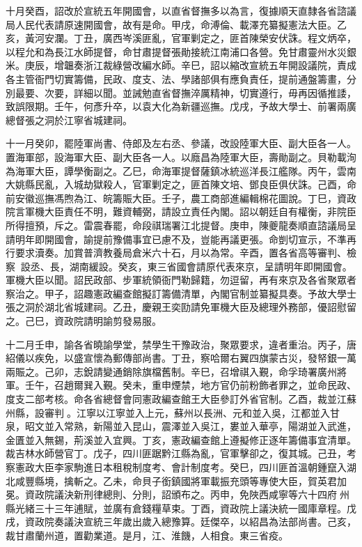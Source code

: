 \begin{pinyinscope}
十月癸酉，詔改於宣統五年開國會，以直省督撫多以為言，復據順天直隸各省諮議局人民代表請原速開國會，故有是命。甲戌，命溥倫、載澤充纂擬憲法大臣。乙亥，黃河安瀾。丁丑，廣西岑溪匪亂，官軍剿定之，匪首陳榮安伏誅。程文炳卒，以程允和為長江水師提督，命甘肅提督張勛接統江南浦口各營。免甘肅靈州水災銀米。庚辰，增韞奏浙江裁綠營改編水師。辛巳，詔以縮改宣統五年開設議院，責成各主管衙門切實籌備，民政、度支、法、學諸部俱有應負責任，提前通盤籌畫，分別最要、次要，詳細以聞。並誡勉直省督撫淬厲精神，切實遵行，毋再因循推諉，致誤限期。壬午，何彥升卒，以袁大化為新疆巡撫。戊戌，予故大學士、前署兩廣總督張之洞於江寧省城建祠。

十一月癸卯，罷陸軍尚書、侍郎及左右丞、參議，改設陸軍大臣、副大臣各一人。置海軍部，設海軍大臣、副大臣各一人。以廕昌為陸軍大臣，壽勛副之。貝勒載洵為海軍大臣，譚學衡副之。乙巳，命海軍提督薩鎮冰統巡洋長江艦隊。丙午，雲南大姚縣民亂，入城劫獄殺人，官軍剿定之，匪首陳文培、鄧良臣俱伏誅。己酉，命前安徽巡撫馮煦為江、皖籌賑大臣。壬子，農工商部進編輯棉花圖說。丁巳，資政院言軍機大臣責任不明，難資輔弼，請設立責任內閣。詔以朝廷自有權衡，非院臣所得擅預，斥之。雷震春罷，命段祺瑞署江北提督。庚申，陳夔龍奏順直諮議局呈請明年即開國會，諭提前豫備事宜已慮不及，豈能再議更張。命剴切宣示，不準再行要求瀆奏。加賞普濟教養局倉米六十石，月以為常。辛酉，置各省高等審判、檢察，設丞、長，湖南緩設。癸亥，東三省國會請原代表來京，呈請明年即開國會。軍機大臣以聞。詔民政部、步軍統領衙門勒歸籍，勿逗留，再有來京及各省聚眾者察治之。甲子，詔趣憲政編查館擬訂籌備清單，內閣官制並纂擬具奏。予故大學士張之洞於湖北省城建祠。乙丑，慶親王奕劻請免軍機大臣及總理外務部，優詔慰留之。己巳，資政院請明諭剪發易服。

十二月壬申，諭各省曉諭學堂，禁學生干豫政治，聚眾要求，違者重治。丙子，唐紹儀以疾免，以盛宣懷為郵傳部尚書。丁丑，察哈爾右翼四旗蒙古災，發帑銀一萬兩賑之。己卯，志銳請變通銷除旗檔舊制。辛巳，召增祺入覲，命孚琦署廣州將軍。壬午，召趙爾巽入覲。癸未，重申煙禁，地方官仍前粉飾者罪之，並命民政、度支二部考核。命各省總督會同憲政編查館王大臣參訂外省官制。乙酉，裁並江蘇州縣，設審判。江寧以江寧並入上元，蘇州以長洲、元和並入吳，江都並入甘泉，昭文並入常熟，新陽並入昆山，震澤並入吳江，婁並入華亭，陽湖並入武進，金匱並入無錫，荊溪並入宜興。丁亥，憲政編查館上遵擬修正逐年籌備事宜清單。裁吉林水師營官丁。戊子，四川匪踞黔江縣為亂，官軍擊卻之，復其城。己丑，考察憲政大臣李家駒進日本租稅制度考、會計制度考。癸巳，四川匪首溫朝鍾竄入湖北咸豐縣境，擒斬之。乙未，命貝子銜鎮國將軍載振充頭等專使大臣，賀英君加冕。資政院議決新刑律總則、分則，詔頒布之。丙申，免陜西咸寧等六十四府州縣光緒三十三年逋賦，並廣有倉錢糧草束。丁酉，資政院上議決統一國庫章程。戊戌，資政院奏議決宣統三年歲出歲入總豫算。廷傑卒，以紹昌為法部尚書。己亥，裁甘肅蘭州道，置勸業道。是月，江、淮饑，人相食。東三省疫。


\end{pinyinscope}
